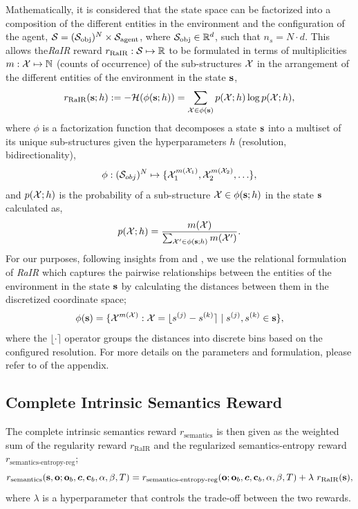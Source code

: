Mathematically, it is considered that the state space can be factorized into a composition of the different entities in the environment and the configuration of the agent, \(\mathcal{S} = (\mathcal{S}_{\text{obj}})^N \times \mathcal{S}_{\text{agent}}\), where \(\mathcal{S}_{\text{obj}} \in \mathbb{R}^d\), such that \(n_s = N \cdot d\).
This allows the\emph {RaIR} reward \(r_{\text{RaIR}}: \mathcal{S} \mapsto \mathbb{R}\) to be formulated in terms of multiplicities \(m: \mathcal{X} \mapsto \mathbb{N}\) (counts of occurrence) of the sub-structures \(\mathcal{X}\) in the arrangement of the different entities of the environment in the state \(\mathbf{s}\),
\begin{equation}
    \label{eq:rair}
    r_{\text{RaIR}}(\mathbf{s}; h) := -\mathcal{H}(\phi(\mathbf{s}; h)) = \sum_{\mathcal{X} \in \phi(\mathbf{s})} p(\mathcal{X}; h) \log p(\mathcal{X}; h),
\end{equation}
where \(\phi\) is a factorization function that decomposes a state \(\mathbf{s}\) into a multiset of its unique sub-structures given the hyperparameters \(h\) (resolution, bidirectionality),
\begin{equation}
    \label{eq:rair-factorization}
    \phi : (\mathcal{S}_{obj})^{N} \mapsto \{ \mathcal{X}_1^{m(\mathcal{X}_1)}, \mathcal{X}_2^{m(\mathcal{X}_2)}, \ldots \},
\end{equation}
and \(p(\mathcal{X}; h)\) is the probability of a sub-structure \(\mathcal{X} \in \phi(\mathbf{s}; h)\) in the state \(\mathbf{s}\) calculated as,
\begin{equation}
    \label{eq:rair-probability}
    p(\mathcal{X}; h) = \dfrac{m(\mathcal{X})}{\sum_{\mathcal{X}' \in \phi(\mathbf{s}; h)} m(\mathcal{X}')}.
\end{equation}
% 
For our purposes, following insights from \cite{symmetry} and \cite{compositional}, we use the relational formulation of \emph{RaIR} which captures the pairwise relationships between the entities of the environment in the state \(\mathbf{s}\) by calculating the distances between them in the discretized coordinate space;
\begin{equation}
    \label{eq:rair-relational}
    \phi(\mathbf{s}) = \{ \mathcal{X}^{m(\mathcal{X})} : \mathcal{X} = \lfloor s^{(j)} - s^{(k)} \rceil \mid s^{(j)}, s^{(k)} \in \mathbf{s} \},
\end{equation}
where the \(\lfloor \cdot \rceil\) operator groups the distances into discrete bins based on the configured resolution.
For more details on the parameters and formulation, please refer to  of the appendix.

\subsection{Complete Intrinsic Semantics Reward}
\label{sec:complete-semantics-reward}
The complete intrinsic semantics reward \(r_{\text{semantics}}\) is then given as the weighted sum of the regularity reward \(r_{\text{RaIR}}\) and the regularized semantics-entropy reward \(r_{\text{semantics-entropy-reg}}\);
\begin{equation}
    \label{eq:semantics-reward}
    r_{\text{semantics}}(\mathbf{s}, \mathbf{o}; \mathbf{o}_b, \bm{c}, \mathbf{c}_b, \alpha, \beta, T) =r_{\text{semantics-entropy-reg}}(\mathbf{o}; \mathbf{o}_b, \bm{c}, \mathbf{c}_b, \alpha, \beta, T) + \lambda\ r_{\text{RaIR}}(\mathbf{s}),
\end{equation}
where \(\lambda\) is a hyperparameter that controls the trade-off between the two rewards.

